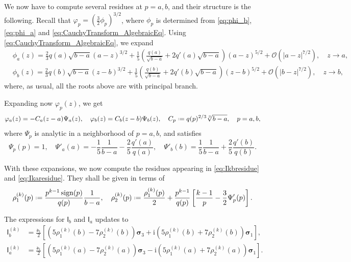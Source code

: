 \documentclass[reqno,a4paper,11pt]{amsart}
\DeclareMathOperator{\sign}{sign}
\newcommand{\Boh}{\mathcal{O}}
\newcommand{\ii}{\mathrm{i}}
\newcommand*{\deff}{\mathrel{\vcenter{\baselineskip0.5ex \lineskiplimit0pt
                     \hbox{\scriptsize.}\hbox{\scriptsize.}}}%
                     =}
\newcommand{\msf}{\mathsf}
\renewcommand{\sp}{\boldsymbol \sigma}
\theoremstyle{definition}
\theoremstyle{remark}
\numberwithin{equation}{section}
\newcommand*{\defeq}{\mathrel{\vcenter{\baselineskip0.5ex \lineskiplimit0pt
                     \hbox{\scriptsize.}\hbox{\scriptsize.}}}%
                     =}
\begin{document}
    
We now have to compute several residues at $p=a,b$, and their structure is the following. Recall that $\varphi_p=(\frac{3}{2}\phi_p)^{3/2}$, where $\phi_p$ is determined from \eqref{eq:phi_b}, \eqref{eq:phi_a} and \eqref{eq:CauchyTransform_AlgebraicEq}. Using \eqref{eq:CauchyTransform_AlgebraicEq}, we expand
%
\begin{align*}
    & \phi_a(z)
        =\frac{2}{3}q(a)\sqrt{b-a}(a-z)^{3/2}+\frac{1}{5}\left( \frac{q(a)}{\sqrt{b-a}}+2q'(a)\sqrt{b-a} \right)(a-z)^{5/2}+\Boh(|a-z|^{7/2}),\quad z\to a,\\
%
    & \phi_b(z)
        =\frac{2}{3}q(b)\sqrt{b-a}(z-b)^{3/2}+\frac{1}{5}\left( \frac{q(b)}{\sqrt{b-a}}+2 q'(b)\sqrt{b-a} \right)(z-b)^{5/2}+\Boh(|b-z|^{7/2}),\quad z\to b,
\end{align*}
%
where, as usual, all the roots above are with principal branch.

Expanding now $\varphi_p(z)$, we get
%
$$
\varphi_a(z)=-C_a(z-a)\Psi_a(z), \quad \varphi_b(z)=C_b(z-b)\Psi_b(z),\quad C_p\deff q(p)^{2/3}\sqrt[3]{b-a},\quad p=a,b,
$$
%
where $\Psi_p$ is analytic in a neighborhood of $p=a,b$, and satisfies
%
$$
    \Psi_p(p)=1,\quad \Psi'_a(a)=-\frac{1}{5}\frac{1}{b-a}-\frac{2}{5}\frac{q'(a)}{q(a)},\quad \Psi'_b(b)=\frac{1}{5}\frac{1}{b-a}+\frac{2}{5}\frac{q'(b)}{q(b)}.
$$
%

With these expansions, we now compute the residues appearing in \eqref{eq:Ikbresidue} and \eqref{eq:Ikaresidue}. They shall be given in terms of
\[
    \rho_1^{(k)}(p) \defeq   \frac{p^{k-1} \sign(p)}{q(p) } \frac{1}{b-a}, \quad 
    \rho_2^{(k)}(p) \defeq \frac{\rho_1^{(k)}(p)}{2} + \frac{p^{k-1}}{q(p)} \left[ \frac{
    k-1}{p} - \frac{3}{2} \Psi'_p(p)\right].
\]

The expressions for $\msf I_b$ and $\msf I_a$ updates to 
\begin{equation}\label{eq:contributions_at_a_and_b}
    \begin{split}
        \msf I_b^{(k)} 
        &= \frac{\msf a_1}{2}\left[ \left(  5 \rho_1^{(k)}(b) - 7\rho_2^{(k)}(b) \right) \sp_3 + \ii \left( 5 \rho_1^{(k)}(b) + 7 \rho_2^{(k)}(b) \right) \sp_1 \right], \\
    \msf I_a^{(k)}
        &= \frac{\msf a_1}{2} \left[ \left(  5 \rho_1^{(k)}(a) - 7\rho_2^{(k)}(a)\right) \sp_3 - \ii \left( 5 \rho_1^{(k)}(a) + 7\rho_2^{(k)}(a)  \right) \sp_1 \right].    
    \end{split}
\end{equation}
\end{document}

